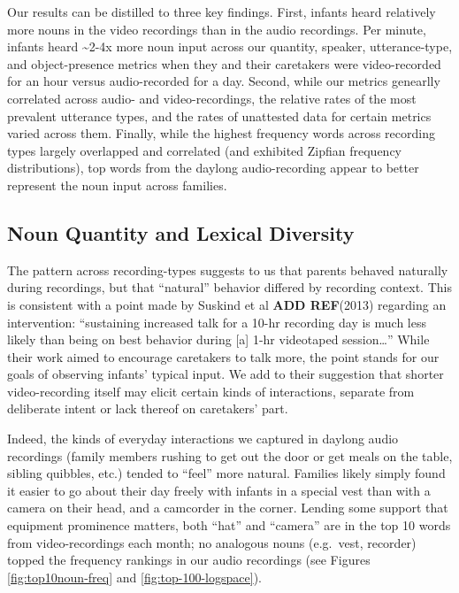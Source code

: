\documentclass[floatsintext,man]{apa6}
\theoremstyle{definition}
\theoremstyle{definition}
\theoremstyle{definition}
\theoremstyle{remark}
\begin{document}
Our results can be distilled to three key findings. First, infants heard
relatively more nouns in the video recordings than in the audio
recordings. Per minute, infants heard \textasciitilde{}2-4x more noun
input across our quantity, speaker, utterance-type, and object-presence
metrics when they and their caretakers were video-recorded for an hour
versus audio-recorded for a day. Second, while our metrics genearlly
correlated across audio- and video-recordings, the relative rates of the
most prevalent utterance types, and the rates of unattested data for
certain metrics varied across them. Finally, while the highest frequency
words across recording types largely overlapped and correlated (and
exhibited Zipfian frequency distributions), top words from the daylong
audio-recording appear to better represent the noun input across
families.

\subsection{Noun Quantity and Lexical
Diversity}\label{noun-quantity-and-lexical-diversity}

The pattern across recording-types suggests to us that parents behaved
naturally during recordings, but that \enquote{natural} behavior
differed by recording context. This is consistent with a point made by
Suskind et al \textbf{ADD REF}(2013) regarding an intervention:
\enquote{sustaining increased talk for a 10-hr recording day is much
less likely than being on best behavior during {[}a{]} 1-hr videotaped
session\ldots{}} While their work aimed to encourage caretakers to talk
more, the point stands for our goals of observing infants' typical
input. We add to their suggestion that shorter video-recording itself
may elicit certain kinds of interactions, separate from deliberate
intent or lack thereof on caretakers' part.

Indeed, the kinds of everyday interactions we captured in daylong audio
recordings (family members rushing to get out the door or get meals on
the table, sibling quibbles, etc.) tended to \enquote{feel} more
natural. Families likely simply found it easier to go about their day
freely with infants in a special vest than with a camera on their head,
and a camcorder in the corner. Lending some support that equipment
prominence matters, both \enquote{hat} and \enquote{camera} are in the
top 10 words from video-recordings each month; no analogous nouns
(e.g.~vest, recorder) topped the frequency rankings in our audio
recordings (see Figures \ref{fig:top10noun-freq} and
\ref{fig:top-100-logspace}).
\end{document}
